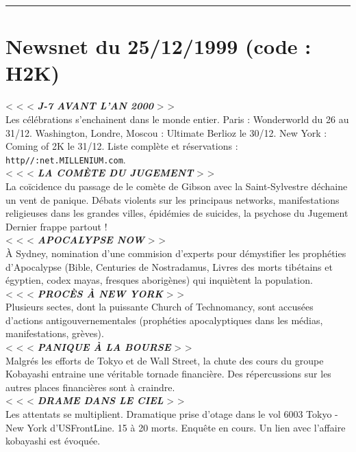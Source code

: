 \documentclass[11pt,twoside,a4paper]{book}
\begin{document}
\hrule

\clearpage

\section*{Newsnet du 25/12/1999 (code : H2K)}

< < <  \textbf{\textit{J-7 AVANT L'AN 2000}} > >~\\
Les c{\'e}l{\'e}brations s'enchainent dans le monde entier. Paris : Wonderworld du 26 au 31/12. Washington, Londre, Moscou : Ultimate Berlioz le 30/12. New York : Coming of 2K le 31/12. Liste compl{\`e}te et r{\'e}servations : \texttt{http//:net.MILLENIUM.com}.~\\
< < <  \textbf{\textit{LA COM{\`E}TE DU JUGEMENT}} > >~\\
La co{\"i}cidence du passage de le com{\`e}te de Gibson avec la Saint-Sylvestre d{\'e}chaine un vent de panique. D{\'e}bats violents sur les principaus networks, manifestations religieuses dans les grandes villes, {\'e}pid{\'e}mies de suicides, la psychose du Jugement Dernier frappe partout !~\\
< < <  \textbf{\textit{APOCALYPSE NOW}} > >~\\
{\`A} Sydney, nomination d'une commision d'experts pour d{\'e}mystifier les proph{\'e}ties d'Apocalypse (Bible, Centuries de Nostradamus, Livres des morts tib{\'e}tains et {\'e}gyptien, codex mayas, fresques aborig{\`e}nes) qui inqui{\`e}tent la population.~\\
< < <  \textbf{\textit{PROC{\`E}S {\`A} NEW YORK}} > >~\\
Plusieurs sectes, dont la puissante Church of Technomancy, sont accus{\'e}es d'actions antigouvernementales (proph{\'e}ties apocalyptiques dans les m{\'e}dias, manifestations, gr{\`e}ves).~\\
< < <  \textbf{\textit{PANIQUE {\`A} LA BOURSE}} > >~\\
Malgr{\'e}s les efforts de Tokyo et de Wall Street, la chute des cours du groupe Kobayashi entraine une v{\'e}ritable tornade financi{\`e}re. Des r{\'e}percussions sur les autres places financi{\`e}res sont {\`a} craindre.~\\
< < <  \textbf{\textit{DRAME DANS LE CIEL}} > >~\\
Les attentats se multiplient. Dramatique prise d'otage dans le vol 6003 Tokyo - New York d'USFrontLine. 15 {\`a} 20 morts. Enqu{\^e}te en cours. Un lien avec l'affaire kobayashi est {\'e}voqu{\'e}e.~\\
\end{document}

